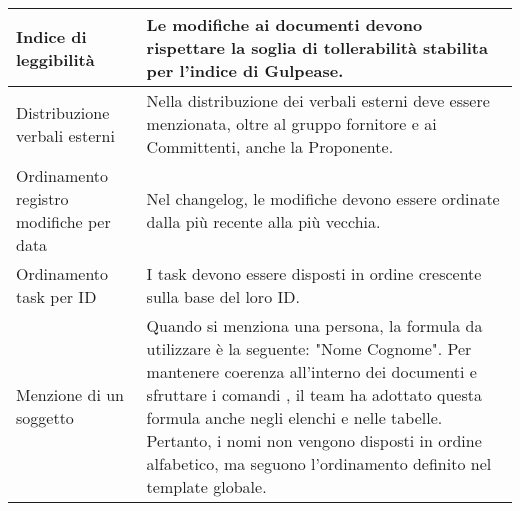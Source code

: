 \begin{adjustwidth}{-0.5cm}{-0.5cm}
\begin{longtable}{|P{4.5cm}|>{\raggedright\arraybackslash}P{9cm}|}
    \hline Indice di leggibilità & Le modifiche ai documenti devono rispettare la soglia di tollerabilità stabilita per l'indice di Gulpease.\\
    \hline Distribuzione verbali esterni & Nella distribuzione dei verbali esterni deve essere menzionata, oltre al gruppo fornitore e ai Committenti, anche la Proponente.\\
    \hline Ordinamento registro modifiche per data & Nel changelog, le modifiche devono essere ordinate dalla più recente alla più vecchia.\\
    \hline Ordinamento task per ID & I task devono essere disposti in ordine crescente sulla base del loro ID. \\
    \hline Menzione di un soggetto & Quando si menziona una persona, la formula da utilizzare è la seguente: "Nome Cognome". Per mantenere coerenza all’interno dei documenti e sfruttare i comandi , il team ha adottato questa formula anche negli elenchi e nelle tabelle. Pertanto, i nomi non vengono disposti in ordine alfabetico, ma seguono l'ordinamento definito nel template globale. \\
  \end{longtable}
\end{adjustwidth}
\egroup

